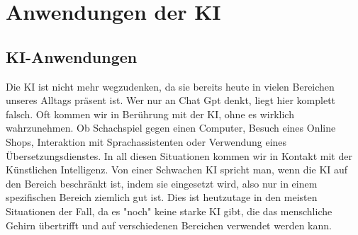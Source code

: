 \chapter{Anwendungen der KI}
\label{chap:Anwendungen}

\section{KI-Anwendungen}
Die KI ist nicht mehr wegzudenken, da sie bereits heute in vielen Bereichen unseres Alltags präsent ist. Wer nur an Chat Gpt denkt, liegt hier komplett falsch. Oft kommen wir in Berührung mit der KI, ohne es wirklich wahrzunehmen. Ob Schachspiel gegen einen Computer, Besuch eines Online Shops, Interaktion mit Sprachassistenten oder Verwendung eines Übersetzungsdienstes. In all diesen Situationen kommen wir in Kontakt mit der Künstlichen Intelligenz. Von einer Schwachen KI spricht man, wenn die KI auf den Bereich beschränkt ist, indem sie eingesetzt wird, also nur in einem spezifischen Bereich ziemlich gut ist. Dies ist heutzutage in den meisten Situationen der Fall, da es "noch" keine starke KI gibt, die das menschliche Gehirn übertrifft und auf verschiedenen Bereichen verwendet werden kann.